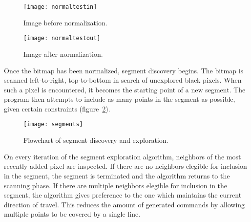 \clearpage
\begin{figure}[ht]
    \centering
    \begin{minipage}{0.5\textwidth}
        \centering
        \texttt{[image: normaltestin]}
        \caption{Image before normalization.}
    \end{minipage}\hfill
    \begin{minipage}{0.5\textwidth}
        \centering
        \texttt{[image: normaltestout]}
        \caption{Image after normalization.}
        \label{normalize}
    \end{minipage}
\end{figure}

Once the bitmap has been normalized, segment discovery begins. The bitmap is
scanned left-to-right, top-to-bottom in search of unexplored black pixels.
When such a pixel is encountered, it becomes the starting point of a new
segment. The program then attempts to include as many points in the segment as
possible, given certain constraints (figure~\ref{segments}).

\begin{figure}[ht]
    \begin{center}
        \texttt{[image: segments]}
        \caption{Flowchart of segment discovery and exploration.}
        \label{segments}
    \end{center}
\end{figure}

On every iteration of the segment exploration algorithm, neighbors of the most
recently added pixel are inspected. If there are no neighbors elegible for
inclusion in the segment, the segment is terminated and the algorithm returns
to the scanning phase. If there are multiple neighbors elegible for inclusion in
the segment, the algorithm gives preference to the one which maintains the
current direction of travel. This reduces the amount of generated commands by
allowing multiple points to be covered by a single line.
